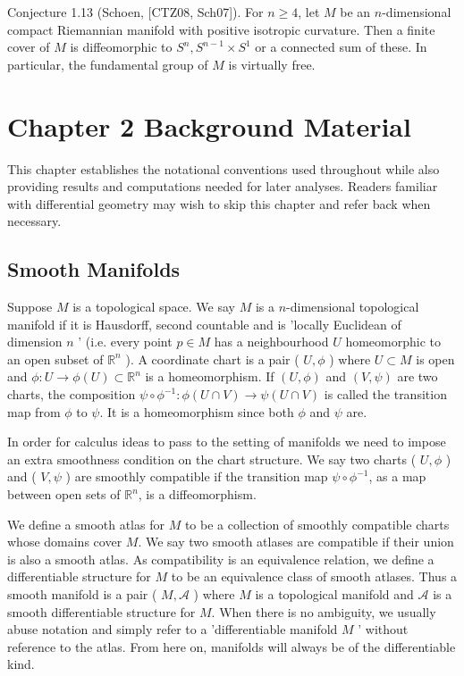\documentclass[10pt, letterpaper]{article}
\begin{document}
Conjecture 1.13 (Schoen, [CTZ08, Sch07]). For $n \geq 4$, let $M$ be an $n$-dimensional compact Riemannian manifold with positive isotropic curvature. Then a finite cover of $M$ is diffeomorphic to $S^{n}, S^{n-1} \times S^{1}$ or a connected sum of these. In particular, the fundamental group of $M$ is virtually free.




\pagebreak


\section{Chapter 2 Background Material}
This chapter establishes the notational conventions used throughout while also providing results and computations needed for later analyses. Readers familiar with differential geometry may wish to skip this chapter and refer back when necessary.

\subsection*{Smooth Manifolds}
Suppose $M$ is a topological space. We say $M$ is a $n$-dimensional topological manifold if it is Hausdorff, second countable and is 'locally Euclidean of dimension $n$ ' (i.e. every point $p \in M$ has a neighbourhood $U$ homeomorphic to an open subset of $\mathbb{R}^{n}$ ). A coordinate chart is a pair ( $U, \phi$ ) where $U \subset M$ is open and $\phi: U \rightarrow \phi(U) \subset \mathbb{R}^{n}$ is a homeomorphism. If $(U, \phi)$ and $(V, \psi)$ are two charts, the composition $\psi \circ \phi^{-1}: \phi(U \cap V) \rightarrow \psi(U \cap V)$ is called the transition map from $\phi$ to $\psi$. It is a homeomorphism since both $\phi$ and $\psi$ are.

In order for calculus ideas to pass to the setting of manifolds we need to impose an extra smoothness condition on the chart structure. We say two charts ( $U, \phi$ ) and ( $V, \psi$ ) are smoothly compatible if the transition map $\psi \circ \phi^{-1}$, as a map between open sets of $\mathbb{R}^{n}$, is a diffeomorphism.

We define a smooth atlas for $M$ to be a collection of smoothly compatible charts whose domains cover $M$. We say two smooth atlases are compatible if their union is also a smooth atlas. As compatibility is an equivalence relation, we define a differentiable structure for $M$ to be an equivalence class of smooth atlases. Thus a smooth manifold is a pair ( $M, \mathscr{A}$ ) where $M$ is a topological manifold and $\mathscr{A}$ is a smooth differentiable structure for $M$. When there is no ambiguity, we usually abuse notation and simply refer to a 'differentiable manifold $M$ ' without reference to the atlas. From here on, manifolds will always be of the differentiable kind.
\end{document}
